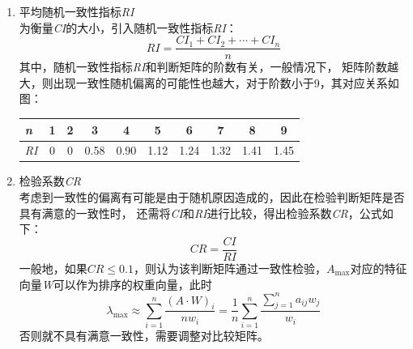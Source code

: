 \documentclass[a4paper, 12pt]{article}
\numberwithin{equation}{section}
\begin{document}
\begin{enumerate}
\begin{enumerate}
                                \item 平均随机一致性指标\textit{RI} \\
                                    为衡量\textit{CI}的大小，引入随机一致性指标\textit{RI}：
                                    \begin{equation}
                                        RI = \frac{CI_{1} + CI_{2} + \cdots + CI_{n}}{n}
                                    \end{equation}
                                    其中，随机一致性指标\textit{RI}和判断矩阵的阶数有关，一般情况下，
                                    矩阵阶数越大，则出现一致性随机偏离的可能性也越大，对于阶数小于9，其对应关系如图：
                                    \begin{table}[h]
                                        \centering
                                        \begin{tabular}{l|c c c c c c c c c} \hline
                                            \textit{n} & 1 & 2 & 3 & 4 & 5 & 6 & 7 & 8 & 9 \\ \hline
                                            \textit{RI} & 0 & 0 & 0.58 & 0.90 & 1.12 & 1.24 & 1.32 & 1.41 & 1.45 \\ \hline
                                        \end{tabular}
                                    \end{table}

                                \item 检验系数\textit{CR} \\
                                    考虑到一致性的偏离有可能是由于随机原因造成的，因此在检验判断矩阵是否具有满意的一致性时，
                                    还需将\textit{CI}和\textit{RI}进行比较，得出检验系数\textit{CR}，公式如下：
                                    \begin{equation}
                                        CR = \frac{CI}{RI}
                                    \end{equation}
                                    一般地，如果$ CR \le 0.1 $，则认为该判断矩阵通过一致性检验，$ A_{\max} $对应的特征向量\textit{W}可以作为排序的权重向量，此时
                                    \begin{equation}
                                        \lambda _{\max} \approx \sum_{i=1}^{n} \frac{ (A \cdot W)_{i}}{nw_{i}} = \frac{1}{n} \sum_{i=1}^{n} \frac{\sum_{j=1}^{n} a_{ij}w_{j}}{w_{i}}
                                    \end{equation}
                                    否则就不具有满意一致性，需要调整对比较矩阵。
                            \end{enumerate}
                    \end{enumerate}
\end{document}

